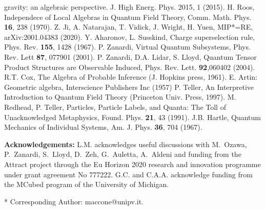\documentclass[aps,prl,amsmath,amssymb,twocolumn,nofootinbib]{revtex4}
\theoremstyle{plain}
\theoremstyle{definition}
\theoremstyle{remark}
\begin{document}
\begin{references}
		gravity: an algebraic perspective. J. High Energ. Phys. 2015, 1
		(2015).%
		H. Roos, Independece of Local Algebras in Quantum Field
		Theory, Comm.  Math. Phys. {\bf 16}, 238 (1970).
		Z. Ji, A. Natarajan, T. Vidick, J. Wright, H. Yuen, MIP*=RE, arXiv:2001.04383 (2020). %
		Y. Aharonov, L. Susskind, Charge superselection
		rule, Phys. Rev. {\bf 155}, 1428 (1967).
		P. Zanardi, Virtual Quantum Subsystems, Phys. Rev.
		Lett {\bf 87}, 077901 (2001).
		 P. Zanardi, D.A. Lidar, S. Lloyd, Quantum
		Tensor Product Structures are Observable Induced, Phys. Rev. Lett.
		{\bf 92},060402 (2004).
		R.T. Cox, The Algebra of Probable Inference (J. Hopkins
		press, 1961).
		 E. Artin: Geometric algebra, Interscience Publishers Inc (1957)
		P. Teller, An Interpretive Introduction to Quantum
		Field Theory (Princeton Univ. Press, 1997).  
		M. Redhead, P. Teller, Particles, Particle Labels, and
		Quanta: The Toll of Unacknowledged Metaphysics, Found. Phys. {\bf
			21}, 43 (1991).
		J.B. Hartle, Quantum Mechanics of Individual Systems,
		Am. J.  Phys. {\bf 36}, 704 (1967).
	\end{references}
	
	\baselineskip
	{\bf Acknowledgements:} L.M. acknowledges useful discussions with
	M.~Ozawa, P.~Zanardi, S.~Lloyd, D.~Zeh, G.~Auletta, A.~Aldeni and
	funding from the Attract project through the Eu Horizon 2020 research
	and innovation programme under grant agreement No 777222. G.C. and
	C.A.A. acknowledge funding from the MCubed program of the University
	of Michigan.
	
	* Corresponding Author: maccone@unipv.it.
	
	
\end{document}
